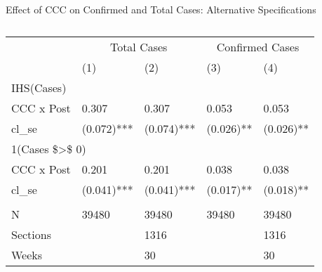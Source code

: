 \begin{table}[ht!]
\centering
\caption{Effect of CCC on Confirmed and Total Cases: Alternative Specifications}
\label{tab:table-b1}
\begin{tabular}{lllll}
\toprule
& \multicolumn{2}{c}{Total Cases} & \multicolumn{2}{c}{Confirmed Cases} \\ 
 \cmidrule(lr){2-3}\cmidrule(lr){4-5}
 & (1) & (2) & (3) & (4) \\ 
\midrule
\multicolumn{3}{l}{IHS(Cases)} \\ 
\midrule
CCC x Post & 0.307 & 0.307 & 0.053 & 0.053 \\ 
cl\_se & (0.072)*** & (0.074)*** & (0.026)** & (0.026)** \\ 
\midrule
\multicolumn{3}{l}{1(Cases \$>\$ 0)} \\ 
\midrule
CCC x Post & 0.201 & 0.201 & 0.038 & 0.038 \\ 
cl\_se & (0.041)*** & (0.041)*** & (0.017)** & (0.018)** \\ 
\midrule
\multicolumn{3}{l}{} \\ 
\midrule
N & 39480 & 39480 & 39480 & 39480 \\ 
Sections &  & 1316 &  & 1316 \\ 
Weeks &  & 30 &  & 30 \\ 
\bottomrule
\end{tabular}
\caption*{\footnotesize}
\end{table}
